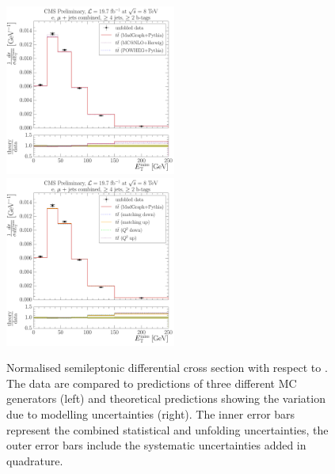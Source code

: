 \begin{figure}[!htbp]
	\centering
  	{\includegraphics[width=0.5\textwidth]{measurement/MET/central/normalised_xsection_combined_different_generators}}\hfill
  	{\includegraphics[width=0.5\textwidth]{measurement/MET/central/normalised_xsection_combined_systematics_shifts}}
    \caption[Normalised semileptonic \ttbar differential cross section with respect to \MET]{Normalised semileptonic
      \ttbar differential cross section with respect to \MET. The data are compared to predictions of three different MC
      generators (left) and theoretical predictions showing the variation due to modelling uncertainties (right). The
      inner error bars represent the combined statistical and unfolding uncertainties, the outer error bars include the
      systematic uncertainties added in quadrature.}
    \label{fig:results_MET_combined}
\end{figure}

